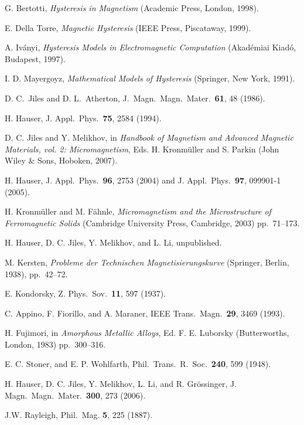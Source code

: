 \documentclass[../main.tex]{subfiles}
\begin{document}
\begin{thebibliography}{99}

G. Bertotti,
{\em Hysteresis in Magnetism} (Academic Press, London, 1998).

E. Della Torre,
{\em Magnetic Hysteresis} (IEEE Press, Piscataway, 1999).

A. Iv\'anyi,
{\em Hysteresis Models in Electromagnetic Computation} (Akad\'emiai Kiad\'o, Budapest, 1997).

I. D. Mayergoyz,
{\em Mathematical Models of Hysteresis} (Springer, New York, 1991).

D. C.\ Jiles and D. L.\ Atherton,
J.\ Magn.\ Magn.\ Mater.\ {\bf 61}, 48 (1986).

H. Hauser,
J. Appl.\ Phys.\ {\bf 75}, 2584 (1994).

D. C. Jiles and Y. Melikhov,
in {\em Handbook of Magnetism and Advanced Magnetic Materials, vol. 2: Micromagnetism},
Eds. H. Kronm\"uller and S. Parkin (John Wiley \& Sons, Hoboken, 2007).

H. Hauser,
J. Appl.\ Phys.\ {\bf 96}, 2753 (2004) and
J. Appl.\ Phys.\ {\bf 97}, 099901-1 (2005).

H. Kronm\"uller and M. F\"ahnle,
{\em Micromagnetism and the Microstructure of Ferromagnetic Solids}
(Cambridge University Press, Cambridge, 2003) pp.~71--173.

H. Hauser, D. C. Jiles, Y. Melikhov, and L. Li,
unpublished.

M. Kersten,
{\em Probleme der Technischen Magnetisierungskurve}
(Springer, Berlin, 1938), pp.\ 42--72.

E. Kondorsky,
Z. Phys.\ Sov.\ {\bf 11}, 597 (1937).

C. Appino, F. Fiorillo, and A. Maraner,
IEEE Trans.\ Magn.\ {\bf 29}, 3469 (1993).

H. Fujimori,
in {\em Amorphous Metallic Alloys}, Ed. F. E. Luborsky
(Butterworths, London, 1983) pp.~300--316.

E. C. Stoner, and E. P. Wohlfarth, 
Phil.\ Trans.\ R.\ Soc.\  {\bf 240}, 599%
(1948).

H. Hauser, D. C. Jiles, Y. Melikhov, L. Li, and R. Gr\"ossinger,
J. Magn.\ Magn.\ Mater.\ {\bf 300}, 273 (2006).

J.W. Rayleigh,
Phil.\ Mag. {\bf 5}, 225 (1887).

\end{thebibliography}

\cleardoublepage
\end{document}
